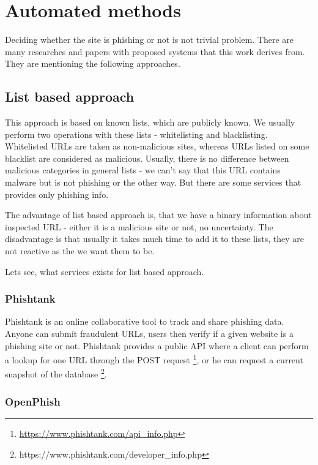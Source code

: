 \documentclass[
  digital, %
  oneside, %
  table,   %
  nolof,     %
  nolot,     %
]{fithesis3}
\begin{document}
\section{Automated methods}
\label{section:automated-methods}

Deciding whether the site is phishing or not is not trivial problem. There are many researches and papers with proposed systems that this work derives from. They are mentioning the following approaches.

\subsection{List based approach}
\label{section:list-based}

This approach is based on known lists, which are publicly known. We usually perform two operations with these lists - whitelisting and blacklisting. Whitelisted URLs are taken as non-malicious sites, whereas URLs listed on some blacklist are considered as malicious. Usually, there is no difference between malicious categories in general lists - we can't say that this URL contains malware but is not phishing or the other way. But there are some services that provides only phishing info.

The advantage of list based approach is, that we have a binary information about inspected URL - either it is a malicious site or not, no uncertainty. The disadvantage is that usually it takes much time to add it to these lists, they are not reactive as the we want them to be.

Lets see, what services exists for list based approach.

\subsubsection{Phishtank}

Phishtank \cite{phishtank} is an online collaborative tool to track and share phishing data. Anyone can submit fraudulent URLs, users then verify if a given website is a phishing site or not. Phishtank provides a public API  where a client can perform a lookup for one URL through the POST request \footnote{\href{https://www.phishtank.com/api_info.php}{https://www.phishtank.com/api\_info.php}}, or he can request a current snapshot of the database \footnote{https://www.phishtank.com/developer\_info.php}. 

\subsubsection{OpenPhish}
\end{document}
